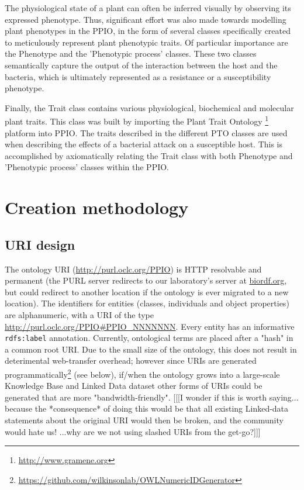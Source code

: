 \documentclass[sw]{iosart2c}
\newcommand{\myurl}[1]{\footnote{\url{#1}}}
\newcommand{\con}[1]{\texttt{#1}\xspace}
\begin{document}
The physiological state of a plant can often be inferred visually by observing its expressed phenotype. Thus, significant effort was also made towards modelling plant phenotypes in the PPIO, in the form of several classes specifically created to meticulously represent plant phenotypic traits.  Of particular importance are the {\sf Phenotype} and the {\sf 'Phenotypic process'} classes. These two classes semantically capture the output of the interaction between the host and the bacteria, which is ultimately represented as a resistance or a susceptibility phenotype.

Finally, the {\sf Trait} class contains various physiological, biochemical and molecular plant traits. This class was built by importing the Plant Trait Ontology \myurl{http://www.gramene.org} platform \cite{PTO} into PPIO. The traits described in the different PTO classes are used when describing the effects of a bacterial attack on a susceptible host. This is accomplished by axiomatically relating the {\sf Trait} class with both {\sf Phenotype} and {\sf 'Phenotypic process'} classes within the PPIO.


\section{Creation methodology}

\subsection{URI design}
The ontology URI (\url{http://purl.oclc.org/PPIO}) is HTTP resolvable and permanent (the PURL server redirects to our laboratory's server at \url{biordf.org}, but could redirect to another location if the ontology is ever migrated to a new location). The identifiers for entities (classes, individuals and object properties) are alphanumeric, with a URI of the type \url{http://purl.oclc.org/PPIO#PPIO_NNNNNNN}. Every entity has an informative \con{rdfs:label} annotation. Currently, ontological terms are placed after a "hash" in a common root URI.  Due to the small size of the ontology, this does not result in deterimental web-transfer overhead; however since URIs are generated programmatically\myurl{https://github.com/wilkinsonlab/OWLNumericIDGenerator} (see below), if/when the ontology grows into a large-scale Knowledge Base and Linked Data dataset other forms of URIs could be generated that are more "bandwidth-friendly".  [[[I wonder if this is worth saying...  because the *consequence* of doing this would be that all existing Linked-data statements about the original URI would then be broken, and the community would hate us!  ...why are we not using slashed URIs from the get-go?]]]
\end{document}
